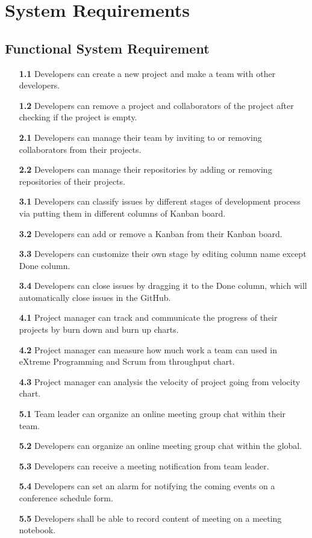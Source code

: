 \documentclass[12pt,a4paper]{report}
\begin{document}
\section{System Requirements}
	\subsection{Functional System Requirement}
		\begin{enumerate}
			\item[\textbf{1.1}] Developers can create a new project and make a team with other developers.
			\item[\textbf{1.2}] Developers can remove a project and collaborators of the project after checking if the project is empty.
			\item[\textbf{2.1}] Developers can manage their team by inviting to or removing collaborators from their projects.
			\item[\textbf{2.2}] Developers can manage their repositories by adding or removing repositories of their projects.
			\item[\textbf{3.1}] Developers can classify issues by different stages of development process via putting them in different columns of Kanban board. 
			\item[\textbf{3.2}] Developers can add or remove a Kanban from their Kanban board.
			\item[\textbf{3.3}] Developers can customize their own stage by editing column name except Done column.
			\item[\textbf{3.4}]	Developers can close issues by dragging it to the Done column, which will automatically close issues in the GitHub. 
			\item[\textbf{4.1}] Project manager can track and communicate the progress of their projects by burn down and burn up charts.
			\item[\textbf{4.2}] Project manager can measure how much work a team can used in eXtreme Programming and Scrum from throughput chart.
			\item[\textbf{4.3}] Project manager can analysis the velocity of project going from velocity chart.
			\item[\textbf{5.1}] Team leader can organize an online meeting group chat within their team.
			\item[\textbf{5.2}] Developers can organize an online meeting group chat within the global.
			\item[\textbf{5.3}] Developers can receive a meeting notification from team leader.
			\item[\textbf{5.4}] Developers can set an alarm for notifying the coming events on a conference schedule form.
			\item[\textbf{5.5}] Developers shall be able to record content of meeting on a meeting notebook.
		\end{enumerate}
\end{document}
